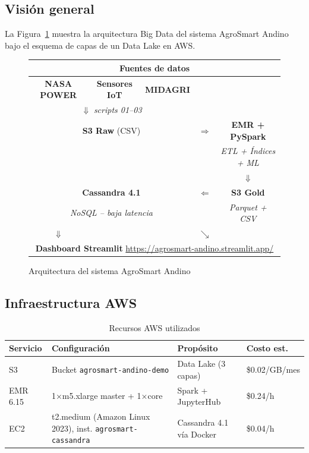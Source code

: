 \documentclass[12pt,a4paper]{article}
\begin{document}
\subsection{Visión general}

La Figura~\ref{fig:arquitectura} muestra la arquitectura Big Data del
sistema AgroSmart Andino bajo el esquema de capas de un Data Lake en AWS.

\begin{figure}[H]
\centering
\renewcommand{\arraystretch}{1.4}
\begin{tabular}{ccccc}
\hline
\multicolumn{5}{c}{\textbf{Fuentes de datos}} \\
\hline
\textcolor{agroazul}{\textbf{NASA POWER}} &
\textcolor{agroazul}{\textbf{Sensores IoT}} &
\textcolor{agroazul}{\textbf{MIDAGRI}} & & \\
\multicolumn{3}{c}{$\Downarrow$ \textit{scripts 01--03}} & & \\
\hline
\multicolumn{3}{c}{\textcolor{agroamarillo!70!black}{\textbf{S3 Raw} (CSV)}} &
$\Rightarrow$ &
\textcolor{agroverde}{\textbf{EMR + PySpark}} \\
& & & & \textit{ETL + Índices + ML} \\
& & & & $\Downarrow$ \\
\hline
\multicolumn{3}{c}{\textcolor{agrorojo}{\textbf{Cassandra 4.1}}} &
$\Leftarrow$ &
\textcolor{agroamarillo!70!black}{\textbf{S3 Gold}} \\
\multicolumn{3}{c}{\textit{NoSQL -- baja latencia}} & &
\textit{Parquet + CSV} \\
$\Downarrow$ & & & $\searrow$ & \\
\hline
\multicolumn{5}{c}{\textcolor{agrogris}{\textbf{Dashboard Streamlit}} \quad \href{https://agrosmart-andino.streamlit.app/}{https://agrosmart-andino.streamlit.app/}} \\
\hline
\end{tabular}
\caption{Arquitectura del sistema AgroSmart Andino}
\label{fig:arquitectura}
\end{figure}

\subsection{Infraestructura AWS}

\begin{table}[H]
\centering
\caption{Recursos AWS utilizados}
\label{tab:aws}
\begin{tabular}{llll}
\toprule
\textbf{Servicio} & \textbf{Configuración} & \textbf{Propósito} & \textbf{Costo est.} \\
\midrule
S3       & Bucket \texttt{agrosmart-andino-demo} & Data Lake (3 capas) & \$0.02/GB/mes \\
EMR 6.15 & 1×m5.xlarge master + 1×core & Spark + JupyterHub   & \$0.24/h \\
EC2      & t2.medium (Amazon Linux 2023), inst. \texttt{agrosmart-cassandra} & Cassandra 4.1 vía Docker & \$0.04/h \\
\bottomrule
\end{tabular}
\end{table}
\end{document}
